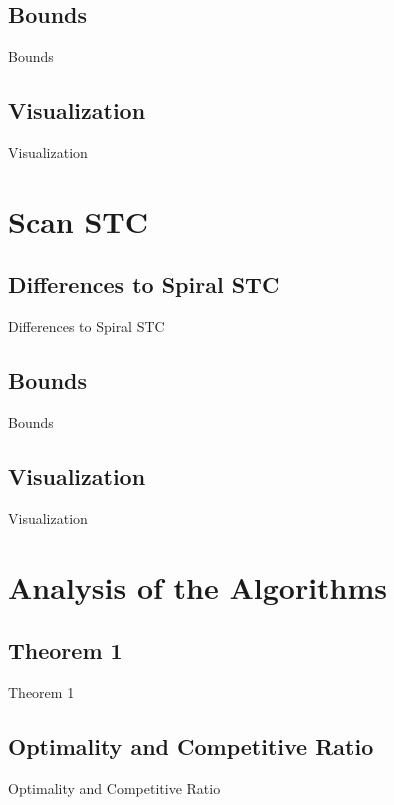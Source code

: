 \documentclass{beamer}
\begin{document}
\subsection{Bounds}
\begin{frame}{Bounds}
\end{frame}
\subsection{Visualization}
\begin{frame}{Visualization}
\end{frame}

\section{Scan STC}
\subsection{Differences to Spiral STC}
\begin{frame}{Differences to Spiral STC}
\end{frame}
\subsection{Bounds}
\begin{frame}{Bounds}
\end{frame}
\subsection{Visualization}
\begin{frame}{Visualization}
\end{frame}

\section{Analysis of the Algorithms}
\subsection{Theorem 1}
\begin{frame}{Theorem 1}
\end{frame}
\subsection{Optimality and Competitive Ratio}
\begin{frame}{Optimality and Competitive Ratio}
\end{frame}
\end{document}
